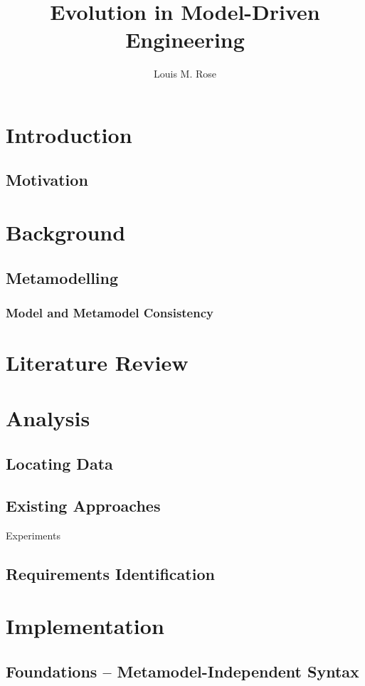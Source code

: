\documentclass[a4paper,10pt]{article}
\title{Evolution in Model-Driven Engineering}
\author{Louis M. Rose}
\begin{document}
\maketitle

\tableofcontents

\section{Introduction}

\subsection{Motivation}

\section{Background}
\subsection{Metamodelling}
\subsubsection{Model and Metamodel Consistency}

\section{Literature Review}

\section{Analysis}
\subsection{Locating Data}
\subsection{Existing Approaches}
Experiments
\subsection{Requirements Identification}

\section{Implementation}
\subsection{Foundations -- Metamodel-Independent Syntax}
\end{document}
